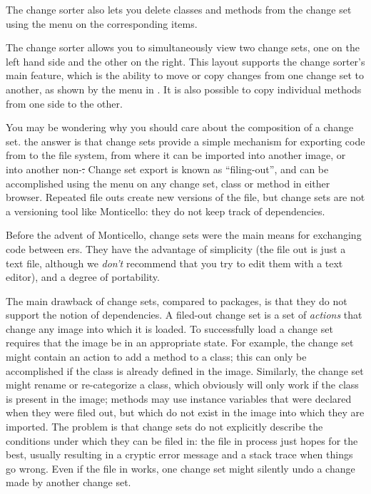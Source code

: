 \documentclass[a4paper,10pt,twoside]{book}
\begin{document}
The change sorter also lets you delete classes and methods from the change set using the \actclick menu on the corresponding items.

The change sorter allows you to simultaneously view two change sets, one on the left hand side and the other on the right.
This layout supports the change sorter's main feature, which is the ability to move or copy changes from one change set to another, as shown by the \actclick menu in .
It is also possible to copy individual methods from one side to the other.

You may be wondering why you should care about the composition of a change set.
the answer is that change sets provide a simple mechanism for exporting code from \pharo to the file system, from where it can be imported into another \pharo image, or into another non-\pharo \st.
Change set export is known as ``filing-out'', and can be accomplished using the \actclick menu on any change set, class or method in either browser.
Repeated file outs create new versions of the file, but change sets are not a versioning tool like Monticello:
they do not keep track of dependencies.

Before the advent of Monticello, change sets were the main means for exchanging code between \pharo{}ers.
They have the advantage of simplicity (the file out is just a text file, although we \emph{don't} recommend that you try to edit them with a text editor), and a degree of portability.  

The main drawback of change sets, compared to  packages, is that they do not support the notion of dependencies.
A filed-out change set is a set of \emph{actions} that change any image into which it is loaded. To successfully load a change set requires that the image be in an appropriate state.
For example, the change set might contain an action to add a method to a class; this can only be accomplished if the class is already defined in the image.
Similarly, the change set might rename or re-categorize a class, which obviously will only work if the class is present in the image; methods may use instance variables that were declared when they were filed out, but which do not exist in the image into which they are imported.
The problem is that change sets do not explicitly describe the conditions under which they can be filed in:
the file in process just hopes for the best, usually resulting in a cryptic error message and a stack trace when things go wrong.
Even if the file in works, one change set might silently undo a change made by another change set.
\end{document}
